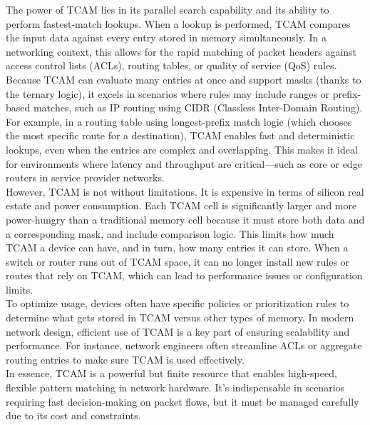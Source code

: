 \documentclass[parindent=0pt]{article}
\begin{document}
The power of TCAM lies in its parallel search capability and its ability to perform fastest-match lookups. When a lookup is performed, TCAM compares the input data against every entry stored in memory simultaneously. In a networking context, this allows for the rapid matching of packet headers against access control lists (ACLs), routing tables, or quality of service (QoS) rules. Because TCAM can evaluate many entries at once and support masks (thanks to the ternary logic), it excels in scenarios where rules may include ranges or prefix-based matches, such as IP routing using CIDR (Classless Inter-Domain Routing).\\

For example, in a routing table using longest-prefix match logic (which chooses the most specific route for a destination), TCAM enables fast and deterministic lookups, even when the entries are complex and overlapping. This makes it ideal for environments where latency and throughput are critical—such as core or edge routers in service provider networks.\\

However, TCAM is not without limitations. It is expensive in terms of silicon real estate and power consumption. Each TCAM cell is significantly larger and more power-hungry than a traditional memory cell because it must store both data and a corresponding mask, and include comparison logic. This limits how much TCAM a device can have, and in turn, how many entries it can store. When a switch or router runs out of TCAM space, it can no longer install new rules or routes that rely on TCAM, which can lead to performance issues or configuration limits.\\

To optimize usage, devices often have specific policies or prioritization rules to determine what gets stored in TCAM versus other types of memory. In modern network design, efficient use of TCAM is a key part of ensuring scalability and performance. For instance, network engineers often streamline ACLs or aggregate routing entries to make sure TCAM is used effectively.\\

In essence, TCAM is a powerful but finite resource that enables high-speed, flexible pattern matching in network hardware. It’s indispensable in scenarios requiring fast decision-making on packet flows, but it must be managed carefully due to its cost and constraints.\\
\end{document}
